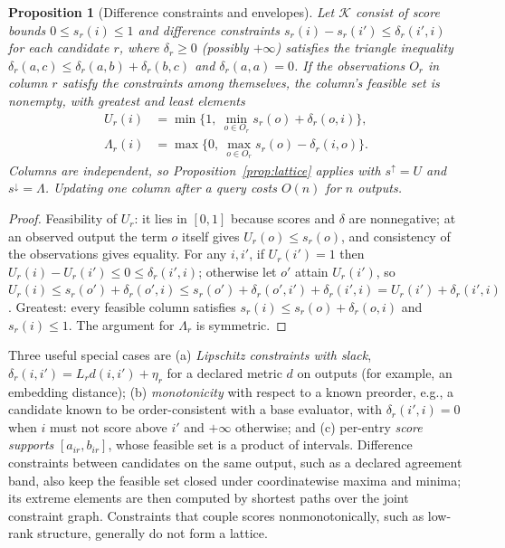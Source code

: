 \documentclass[11pt]{article}
\newtheorem{proposition}{Proposition}
\begin{document}
\begin{proposition}[Difference constraints and envelopes]
\label{prop:envelope}
Let $\mathcal K$ consist of score bounds $0\le s_r(i)\le1$ and difference constraints $s_r(i)-s_r(i')\le\delta_r(i',i)$ for each candidate $r$, where $\delta_r\ge0$ (possibly $+\infty$) satisfies the triangle inequality $\delta_r(a,c)\le\delta_r(a,b)+\delta_r(b,c)$ and $\delta_r(a,a)=0$. If the observations $O_r$ in column $r$ satisfy the constraints among themselves, the column's feasible set is nonempty, with greatest and least elements
\begin{align*}
U_r(i)&=\min\{1,\ \min_{o\in O_r}s_r(o)+\delta_r(o,i)\},\\
\Lambda_r(i)&=\max\{0,\ \max_{o\in O_r}s_r(o)-\delta_r(i,o)\}.
\end{align*}
Columns are independent, so Proposition~\ref{prop:lattice} applies with $s^\uparrow=U$ and $s^\downarrow=\Lambda$. Updating one column after a query costs $O(n)$ for $n$ outputs.
\end{proposition}
\begin{proof}
Feasibility of $U_r$: it lies in $[0,1]$ because scores and $\delta$ are nonnegative; at an observed output the term $o$ itself gives $U_r(o)\le s_r(o)$, and consistency of the observations gives equality. For any $i,i'$, if $U_r(i')=1$ then $U_r(i)-U_r(i')\le0\le\delta_r(i',i)$; otherwise let $o'$ attain $U_r(i')$, so $U_r(i)\le s_r(o')+\delta_r(o',i)\le s_r(o')+\delta_r(o',i')+\delta_r(i',i)=U_r(i')+\delta_r(i',i)$. Greatest: every feasible column satisfies $s_r(i)\le s_r(o)+\delta_r(o,i)$ and $s_r(i)\le1$. The argument for $\Lambda_r$ is symmetric.
\end{proof}
Three useful special cases are (a) \emph{Lipschitz constraints with slack}, $\delta_r(i,i')=L_rd(i,i')+\eta_r$ for a declared metric $d$ on outputs (for example, an embedding distance); (b) \emph{monotonicity} with respect to a known preorder, e.g., a candidate known to be order-consistent with a base evaluator, with $\delta_r(i',i)=0$ when $i$ must not score above $i'$ and $+\infty$ otherwise; and (c) per-entry \emph{score supports} $[a_{ir},b_{ir}]$, whose feasible set is a product of intervals. Difference constraints between candidates on the same output, such as a declared agreement band, also keep the feasible set closed under coordinatewise maxima and minima; its extreme elements are then computed by shortest paths over the joint constraint graph. Constraints that couple scores nonmonotonically, such as low-rank structure, generally do not form a lattice.
\end{document}
